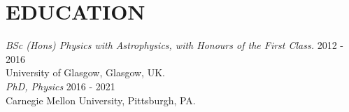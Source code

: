 
\section{EDUCATION}

{\sl BSc (Hons) Physics with Astrophysics, with Honours of the First Class.}  \hfill  2012 - 2016 \\
University of Glasgow, Glasgow, UK. \\

{\sl PhD, Physics}  \hfill  2016 - 2021 \\
Carnegie Mellon University, Pittsburgh, PA. \\